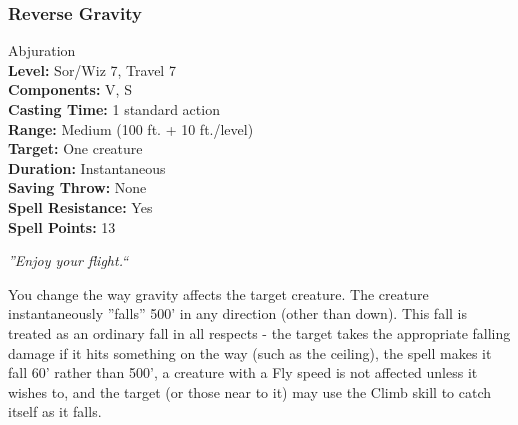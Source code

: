 \subsubsection{Reverse Gravity}
\label{Spell:ReverseGravity}
Abjuration
\\ \textbf{Level:} Sor/Wiz 7, Travel 7
\\ \textbf{Components:} V, S
\\ \textbf{Casting Time:} 1 standard action
\\ \textbf{Range:} Medium (100 ft. + 10 ft./level)
\\ \textbf{Target:} One creature
\\ \textbf{Duration:} Instantaneous
\\ \textbf{Saving Throw:} None
\\ \textbf{Spell Resistance:} Yes
\\ \textbf{Spell Points:} 13

\emph{''Enjoy your flight.``}

You change the way gravity affects the target creature.
The creature instantaneously ''falls'' 500' in any direction (other than down).
This fall is treated as an ordinary fall in all respects - the target takes the appropriate falling damage if it hits something on the way (such as the ceiling),
the  spell makes it fall 60' rather than 500', a creature with a Fly speed is not affected unless it wishes to, 
and the target (or those near to it) may use the Climb skill to catch itself as it falls.

